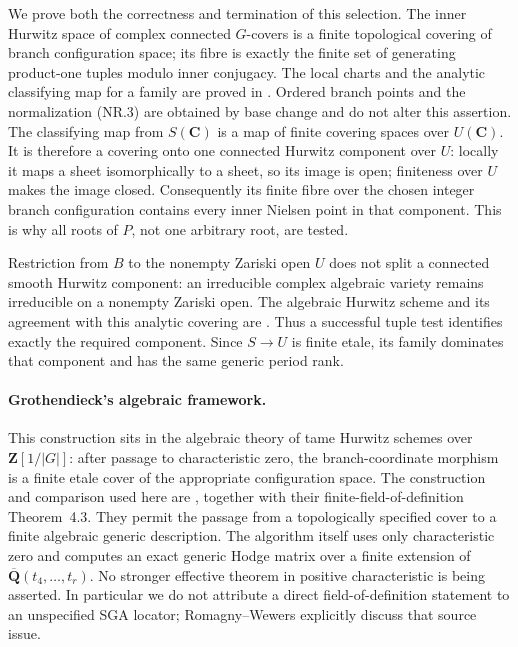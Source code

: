 We prove both the correctness and termination of this selection.
The inner Hurwitz space of complex connected $G$-covers is a finite
topological covering of branch configuration space; its fibre is exactly
the finite set of generating product-one tuples modulo inner conjugacy.
The local charts and the analytic classifying map for a family are proved
in \cite[Theorem~3.1, Propositions~3.2 and~3.4, pp.~319--321]{NR:RW}.
Ordered branch points and the normalization (NR.3) are obtained by base
change and do not alter this assertion.  The classifying map from
$S(\mathbf C)$ is a map of finite covering spaces over $U(\mathbf C)$.
It is therefore a covering onto one connected Hurwitz component over
$U$: locally it maps a sheet isomorphically to a sheet, so its image is
open; finiteness over $U$ makes the image closed.  Consequently its finite
fibre over the chosen integer branch configuration contains every inner
Nielsen point in that component.  This is why all roots of $P$, not one
arbitrary root, are tested.

Restriction from $B$ to the nonempty Zariski open $U$ does not split a
connected smooth Hurwitz component: an irreducible complex algebraic
variety remains irreducible on a nonempty Zariski open.  The algebraic
Hurwitz scheme and its agreement with this analytic covering are
\cite[Theorem~4.11, pp.~328--331, and Remark~4.15(i)]{NR:RW}.
Thus a successful tuple test identifies exactly the required component.
Since $S\to U$ is finite etale, its family dominates that component and
has the same generic period rank.

\paragraph{Grothendieck's algebraic framework.}
This construction sits in the algebraic theory of tame Hurwitz schemes
over $\mathbf Z[1/|G|]$: after passage to characteristic zero, the
branch-coordinate morphism is a finite etale cover of the appropriate
configuration space.  The construction and comparison used here are
\cite[Theorem~4.11 and Remark~4.15]{NR:RW}, together with their
finite-field-of-definition Theorem~4.3.  They permit the passage from a
topologically specified cover to a finite algebraic generic description.
The algorithm itself uses only characteristic zero and computes an exact
generic Hodge matrix over a finite extension of
$\overline{\mathbf Q}(t_4,\ldots,t_r)$.  No stronger effective theorem in
positive characteristic is being asserted.  In particular we do not
attribute a direct field-of-definition statement to an unspecified SGA
locator; Romagny--Wewers explicitly discuss that source issue.

